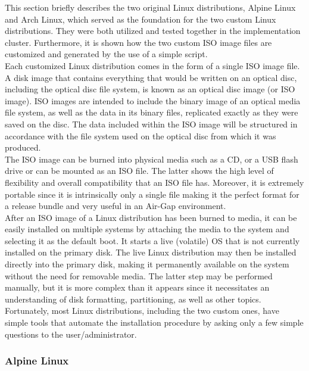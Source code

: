 This section briefly describes the two original Linux distributions, Alpine Linux
and Arch Linux, which served as the foundation for the two custom Linux
distributions. They were both utilized and tested together in the implementation
cluster. Furthermore, it is shown how the two custom ISO image files are customized
and generated by the use of a simple script. \\ %
Each customized Linux distribution comes in the form of a single ISO image file.
A disk image that contains everything that would be written on an optical disc, including
the optical disc file system, is known as an optical disc image (or ISO image). ISO
images are intended to include the binary image of an optical media file system,
as well as the data in its binary files, replicated exactly as they were saved on
the disc. The data included within the ISO image will be structured in
accordance with the file system used on the optical disc from which it was
produced\cite{iso}. \\ %
The ISO image can be burned into physical media such as a CD, or a USB flash
drive or can be mounted as an ISO file. The latter shows the high level of flexibility
and overall compatibility that an ISO file has. Moreover, it is extremely portable
since it is intrinsically only a single file making it the perfect format for a release
bundle and very useful in an Air-Gap environment. \\ %
After an ISO image of a Linux distribution has been burned to media, it can be
easily installed on multiple systems by attaching the media to the system and
selecting it as the default boot. It starts a live (volatile) OS that is not currently
installed on the primary disk. The live Linux distribution may then be installed
directly into the primary disk, making it permanently available on the system without
the need for removable media. The latter step may be performed manually, but it is
more complex than it appears since it necessitates an understanding of disk formatting,
partitioning, as well as other topics. Fortunately, most Linux distributions,
including the two custom ones, have simple tools that automate the installation procedure
by asking only a few simple questions to the user/administrator.

\subsubsection{Alpine Linux}
\label{subsubsec:implementation_distributions_iso_alpine_linux}

